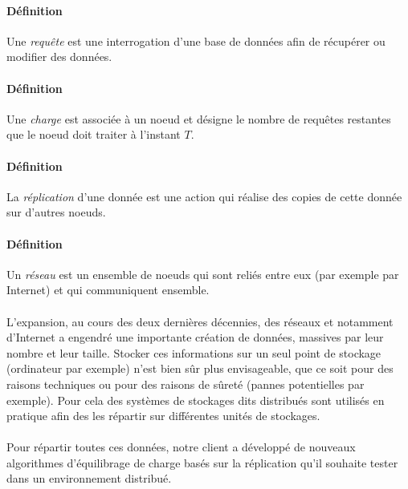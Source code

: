\documentclass[12pt]{article}
\begin{document}


\paragraph{Définition} Une \textit{requête} est une interrogation d'une base de données afin de récupérer ou modifier des données.

\paragraph{Définition} Une \textit{charge} est associée à un noeud et désigne le nombre de requêtes restantes que le noeud doit traiter à l'instant $T$.

\paragraph{Définition} La \textit{réplication} d'une donnée est une action qui réalise des copies de cette donnée sur d'autres noeuds.

\paragraph{Définition} Un \textit{réseau} est un ensemble de noeuds qui sont reliés entre eux (par exemple par Internet) et qui communiquent ensemble.

\paragraph{} L'expansion, au cours des deux dernières décennies, des réseaux et notamment d'Internet a engendré une importante création de données, massives par leur nombre et leur taille.
Stocker ces informations sur un seul point de stockage (ordinateur par exemple) n'est bien sûr plus envisageable, que ce soit pour des raisons techniques ou pour des raisons de sûreté (pannes potentielles par exemple).
Pour cela des systèmes de stockages dits distribués sont utilisés en pratique afin des les répartir sur différentes unités de stockages.

\paragraph{} Pour répartir toutes ces données, notre client a développé de nouveaux algorithmes d'équilibrage de charge basés sur la réplication qu'il souhaite tester dans un environnement distribué.
\end{document}
